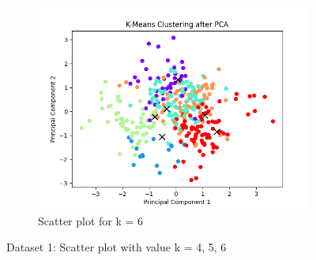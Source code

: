 \documentclass[12pt]{report}
\begin{document}
\begin{figure}[H]
\begin{subfigure}{.5\textwidth}
			\includegraphics[width=.9\linewidth]{../K-means/Output/Dataset1/scatterPlot_k=6.png}
			\caption{Scatter plot for k = 6}
			\label{Dataset1Scatterplotk6}
		\end{subfigure}
		\caption{Dataset 1: Scatter plot with value k = 4, 5, 6}
		\label{Dataset1Scatterplot456}
	\end{figure}
\end{document}
